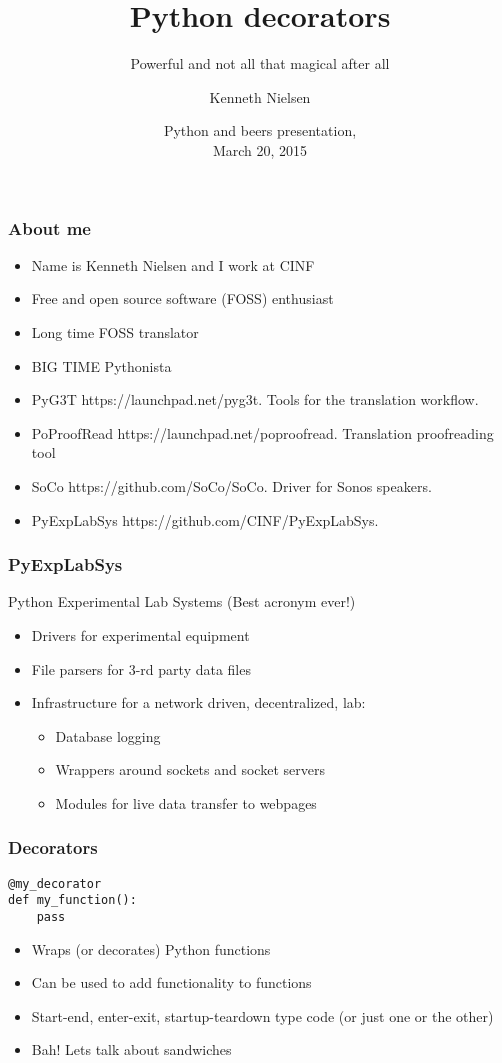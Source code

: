 \documentclass{beamer}
\title{Python decorators}
\subtitle{Powerful and not all that magical after all}
\author{Kenneth Nielsen\inst{1}}
\institute
{
  \inst{1}%
  Center for Individual Nanoparticle Functionality (CINF)\\
  Institute of Physics\\
  Technical University of Denmark (DTU)
}
\date{
  Python and beers presentation,\\
  March 20, 2015}
\begin{document}
\frame{\titlepage}

\begin{frame}
  \frametitle{About me}
  \begin{itemize}
    \item Name is Kenneth Nielsen and I work at CINF
    \item Free and open source software (FOSS) enthusiast
    \item Long time FOSS translator
    \item BIG TIME Pythonista
    \item PyG3T https://launchpad.net/pyg3t. Tools for the translation
      workflow.
    \item PoProofRead https://launchpad.net/poproofread. Translation
      proofreading tool
    \item SoCo https://github.com/SoCo/SoCo. Driver for Sonos speakers.
    \item PyExpLabSys https://github.com/CINF/PyExpLabSys.
  \end{itemize}
\end{frame}

\begin{frame}
  \frametitle{PyExpLabSys}
  {\color{blue}Py}thon {\color{blue}Exp}erimental {\color{blue}Lab}
  {\color{blue}Sys}tems (Best acronym ever!)
  \begin{itemize}
  \item Drivers for experimental equipment
  \item File parsers for 3-rd party data files
  \item Infrastructure for a network driven, decentralized, lab:
    \begin{itemize}
    \item Database logging
    \item Wrappers around sockets and socket servers
    \item Modules for live data transfer to webpages
    \end{itemize}
  \end{itemize}
\end{frame}

\begin{frame}[fragile]
  \frametitle{Decorators}
\begin{verbatim}
@my_decorator
def my_function():
    pass
\end{verbatim}

\begin{exampleblock}{}
  \begin{itemize}
  \item Wraps (or decorates) Python functions
  \item Can be used to add functionality to functions
  \item Start-end, enter-exit, startup-teardown type code (or just one or the other)
  \item Bah! Lets talk about sandwiches
  \end{itemize}
\end{exampleblock}
\end{frame}
\end{document}
